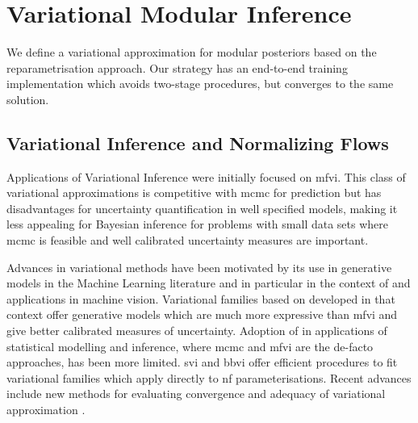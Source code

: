 \section{Variational Modular Inference}\label{sec:vi_modular}

We define a variational approximation for modular posteriors based on the reparametrisation approach.
Our strategy has an end-to-end training implementation which avoids two-stage procedures, but converges to the same solution.


\subsection[Variational Inference and Normalizing Flows]{Variational Inference and Normalizing Flows} \label{sec:vi_nf}

Applications of Variational Inference
\citep{Jordan1999variational, Wainwright2008, Blei2017variational} were initially focused on \acrfull*{mfvi}.
This class of variational approximations is competitive with \acrshort*{mcmc} for prediction \citep{Wang2019VariationalMisspecification} but has disadvantages for uncertainty quantification in well specified models, making it less appealing for Bayesian inference for problems with small data sets where \acrshort*{mcmc} is feasible and well calibrated uncertainty measures are important.

Advances in variational methods have been motivated by its use in generative models in the Machine Learning literature and in particular in the context of  \cite{Kingma2013vae,Kingma2019vaeintro} and applications in machine vision.
Variational families based on  \citep{Rezende2015nf, Papamakarios2021normalizing, Kobyzev2020normalizing} developed in that context offer generative models which are much more expressive than \acrshort*{mfvi} and give better calibrated measures of uncertainty.
Adoption of  in applications of statistical modelling and inference, where \acrshort*{mcmc} and \acrshort*{mfvi} are the de-facto approaches, has been more limited.
\acrfull*{svi} \citep{Hoffman2013svi} and \acrfull*{bbvi} \citep{Ranganath2014bbvi} offer efficient procedures to fit variational families which apply directly to \acrshort*{nf} parameterisations.
Recent advances include new methods for evaluating convergence and adequacy of variational approximation \citep{Yao2018yesbut,Xing19,Agrawal2020,Dhaka2020robust}.

